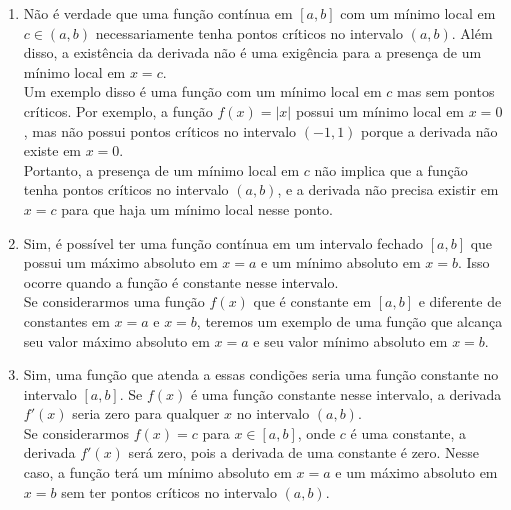 \documentclass{article}
\begin{document}
\begin{enumerate}
\begin{enumerate}
		      \item
		            Não é verdade que uma função contínua em \([a, b]\) com um
		            mínimo local em \(c \in (a, b)\) necessariamente tenha
		            pontos críticos no intervalo \((a, b)\). Além disso, a
		            existência da derivada não é uma exigência para a presença
		            de um mínimo local em \(x = c\). \\

		            Um exemplo disso é uma função com um mínimo local em \(c\)
		            mas sem pontos críticos. Por exemplo, a função \(f(x) =
		            |x|\) possui um mínimo local em \(x = 0\), mas não possui
		            pontos críticos no intervalo \((-1, 1)\) porque a derivada
		            não existe em \(x = 0\). \\

		            Portanto, a presença de um mínimo local em \(c\) não
		            implica que a função tenha pontos críticos no intervalo
		            \((a, b)\), e a derivada não precisa existir em \(x = c\)
		            para que haja um mínimo local nesse ponto. \\

		      \item
		            Sim, é possível ter uma função contínua em um intervalo fechado \([a, b]\) que
		            possui um máximo absoluto em \(x = a\) e um mínimo absoluto em \(x
		            = b\). Isso ocorre quando a função é constante nesse intervalo. \\

		            Se considerarmos uma função \(f(x)\) que é constante em
		            \([a, b]\) e diferente de constantes em \(x = a\) e \(x =
		            b\), teremos um exemplo de uma função que alcança seu valor
		            máximo absoluto em \(x = a\) e seu valor mínimo absoluto em
		            \(x = b\). \\

		      \item
		            Sim, uma função que atenda a essas condições seria uma função constante no
		            intervalo \([a, b]\). Se \(f(x)\) é uma função constante nesse intervalo, a
		            derivada \(f'(x)\) seria zero para qualquer \(x\) no intervalo \((a, b)\). \\

		            Se considerarmos \(f(x) = c\) para \(x \in [a, b]\), onde \(c\) é uma
		            constante, a derivada \(f'(x)\) será zero, pois a derivada de uma constante é
		            zero. Nesse caso, a função terá um mínimo absoluto em \(x = a\) e um máximo
		            absoluto em \(x = b\) sem ter pontos críticos no intervalo \((a, b)\). \\


\end{enumerate}
\end{enumerate}
\end{document}
